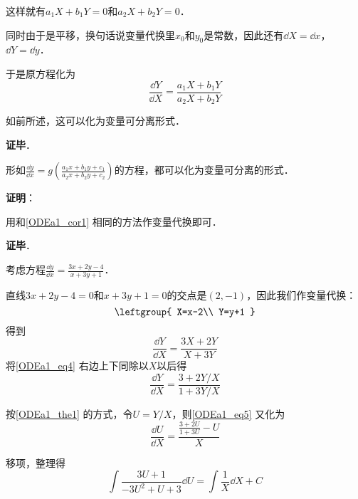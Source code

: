 这样就有$a_1X+b_1Y=0$和$a_2X+b_2Y=0$．

同时由于是平移，换句话说变量代换里$x_0$和$y_0$是常数，因此还有$\dd X=\dd x$，$\dd Y=\dd y$．

于是原方程化为
\begin{equation}
\frac{\dd Y}{\dd X}=\frac{a_1X+b_1Y}{a_2X+b_2Y}
\end{equation}

如前所述，这可以化为变量可分离形式．

\textbf{证毕}．

\begin{corollary}{}
形如$\frac{\dd y}{\dd x}=g(\frac{a_1x+b_1y+c_1}{a_2x+b_2y+c_2})$的方程，都可以化为变量可分离的形式．
\end{corollary}

\textbf{证明}：

用和\autoref{ODEa1_cor1} 相同的方法作变量代换即可．

\textbf{证毕}．





\begin{example}{}
考虑方程$\frac{\dd y}{\dd x}=\frac{3x+2y-4}{x+3y+1}$．

直线$3x+2y-4=0$和$x+3y+1=0$的交点是$(2, -1)$，因此我们作变量代换：
\begin{equation}
\leftgroup{
    X=x-2\\
    Y=y+1
}
\end{equation}
得到
\begin{equation}\label{ODEa1_eq4}
\frac{\dd Y}{\dd X}=\frac{3X+2Y}{X+3Y}
\end{equation}
将\autoref{ODEa1_eq4} 右边上下同除以$X$以后得
\begin{equation}\label{ODEa1_eq5}
\frac{\dd Y}{\dd X}=\frac{3+2Y/X}{1+3Y/X}
\end{equation}

按\autoref{ODEa1_the1} 的方式，令$U=Y/X$，则\autoref{ODEa1_eq5} 又化为
\begin{equation}
\frac{\dd U}{\dd X}=\frac{\frac{3+2U}{1+3U}-U}{X}
\end{equation}

移项，整理得
\begin{equation}
\int\frac{3U+1}{-3U^2+U+3}\dd U=\int\frac{1}{X}\dd X+C
\end{equation}

\end{example}








